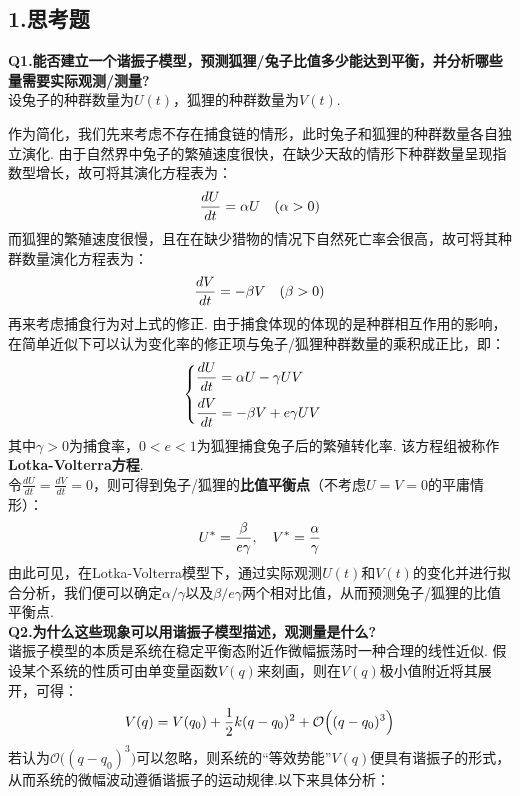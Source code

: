 \documentclass{ctexart}
\begin{document}
\subsection*{1.\quad 思考题}
\noindent \textbf{Q1.\quad 能否建立一个谐振子模型，预测狐狸/兔子比值多少能达到平衡，并分析哪些量需要实际观测/测量?}\\

设兔子的种群数量为$U(t)$，狐狸的种群数量为$V(t)$.

作为简化，我们先来考虑不存在捕食链的情形，此时兔子和狐狸的种群数量各自独立演化. 由于自然界中兔子的繁殖速度很快，在缺少天敌的情形下种群数量呈现指数型增长，故可将其演化方程表为：
\begin{equation}
  \frac{dU}{dt}=\alpha U \quad(\alpha>0) \notag
\end{equation}
而狐狸的繁殖速度很慢，且在在缺少猎物的情况下自然死亡率会很高，故可将其种群数量演化方程表为：
\begin{equation}
  \frac{dV}{dt}=-\beta V \quad (\beta>0) \notag
\end{equation}
再来考虑捕食行为对上式的修正. 由于捕食体现的体现的是种群相互作用的影响，在简单近似下可以认为变化率的修正项与兔子/狐狸种群数量的乘积成正比，即：
\begin{equation}
\begin{cases}
  \displaystyle\frac{dU}{dt}=\alpha U-\gamma UV \vspace*{0.5em}\notag \\
 \displaystyle \frac{dV}{dt}=-\beta V+e\gamma UV \notag
\end{cases}
\end{equation}
其中$\gamma>0$为捕食率，$0<e<1$为狐狸捕食兔子后的繁殖转化率. 该方程组被称作\textbf{Lotka-Volterra方程}.\\

令$\displaystyle\frac{dU}{dt}=\displaystyle\frac{dV}{dt}=0$，则可得到兔子/狐狸的\textbf{比值平衡点}（不考虑$U=V=0$的平庸情形）：
\begin{equation}
    U^*=\displaystyle\frac{\beta}{e\gamma},\quad V^*=\displaystyle\frac{\alpha}{\gamma} \notag
\end{equation}
由此可见，在Lotka-Volterra模型下，通过实际观测$U(t)$和$V(t)$的变化并进行拟合分析，我们便可以确定$\alpha/\gamma$以及$\beta/e\gamma$两个相对比值，从而预测兔子/狐狸的比值平衡点.\\

\noindent \textbf{Q2.\quad 为什么这些现象可以用谐振子模型描述，观测量是什么?}\\ 

谐振子模型的本质是系统在稳定平衡态附近作微幅振荡时一种合理的线性近似. 假设某个系统的性质可由单变量函数$V(q)$来刻画，则在$V(q)$极小值附近将其展开，可得：
\begin{equation}
  V(q)=V(q_0)+\displaystyle\frac{1}{2}k(q-q_0)^2 +\mathcal{O}\Big( (q-q_0)^3 \Big) \notag
\end{equation}
若认为$\mathcal{O} \Big( (q-q_0)^3 \Big)$可以忽略，则系统的“等效势能”$V(q)$便具有谐振子的形式，从而系统的微幅波动遵循谐振子的运动规律.以下来具体分析：\\
\end{document}
